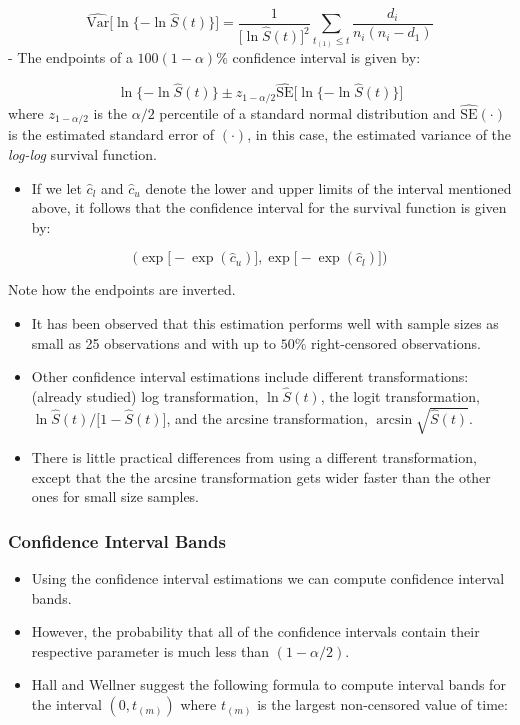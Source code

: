 \documentclass[]{article}
\providecommand{\tightlist}{%
  \setlength{\itemsep}{0pt}\setlength{\parskip}{0pt}}
\begin{document}
\[\hat{\text{Var}}\Big[\ln\{-\ln \hat{S}(t)\}\Big] = \frac{1}{\big[\ln \hat{S}(t)\big]^2} \sum\limits_{t_{(1)}\leq t} \frac{d_i}{n_i(n_i-d_1)}\]
- The endpoints of a \(100(1-\alpha)\%\) confidence interval is given
by:

\[\ln\{-\ln \hat{S}(t)\} \pm z_{1-\alpha/2} \hat{\text{SE}}\big[\ln\{-\ln \hat{S}(t)\}\big]\]
where \(z_{1-\alpha/2}\) is the \(\alpha/2\) percentile of a standard
normal distribution and \(\hat{\text{SE}}(\cdot)\) is the estimated
standard error of \((\cdot)\), in this case, the estimated variance of
the \emph{log-log} survival function.

\begin{itemize}
\tightlist
\item
  If we let \(\hat{c}_l\) and \(\hat{c}_u\) denote the lower and upper
  limits of the interval mentioned above, it follows that the confidence
  interval for the survival function is given by:
\end{itemize}

\[\big(\exp\big[-\exp(\hat{c}_u)\big], \exp\big[-\exp(\hat{c}_l)\big]\big)\]

Note how the endpoints are inverted.

\begin{itemize}
\tightlist
\item
  It has been observed that this estimation performs well with sample
  sizes as small as 25 observations and with up to \(50\%\)
  right-censored observations.
\item
  Other confidence interval estimations include different
  transformations: (already studied) log transformation,
  \(\ln\hat{S}(t)\), the logit transformation,
  \(\ln{\hat{S}(t) / \big[1-\hat{S}(t)\big]}\), and the arcsine
  transformation, \(\arcsin \sqrt{\hat{S}(t)}\).
\item
  There is little practical differences from using a different
  transformation, except that the the arcsine transformation gets wider
  faster than the other ones for small size samples.
\end{itemize}

\hypertarget{confidence-interval-bands}{%
\subsubsection{Confidence Interval
Bands}\label{confidence-interval-bands}}

\begin{itemize}
\tightlist
\item
  Using the confidence interval estimations we can compute confidence
  interval bands.
\item
  However, the probability that all of the confidence intervals contain
  their respective parameter is much less than \((1-\alpha/2)\).
\item
  Hall and Wellner suggest the following formula to compute interval
  bands for the interval \((0, t_{(m)})\) where \(t_{(m)}\) is the
  largest non-censored value of time:
\end{itemize}
\end{document}
